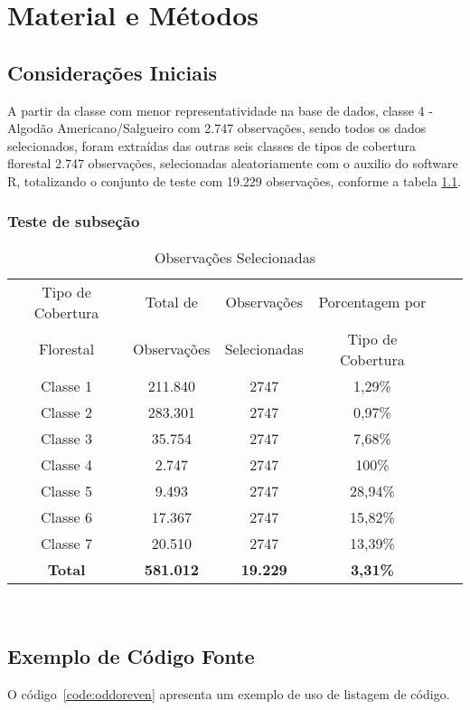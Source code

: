\chapter{Material e Métodos}

\section[CONSIDERAÇÕES INICIAIS]{Considerações Iniciais}
A partir da classe com menor representatividade na base de dados, classe 4 - Algodão Americano/Salgueiro com 2.747 observações, sendo todos os dados selecionados, foram extraídas das outras seis classes de tipos de cobertura florestal 2.747 observações, selecionadas aleatoriamente com o auxilio do software R, totalizando o conjunto de teste com 19.229 observações, conforme a tabela \ref{tb:dados}.
\subsection[Teste de subseção]{ Teste de subseção}
\begin{table}[htbp]
\caption{Observações Selecionadas}
\label{tb:dados}
\centering
\setlength{\tabcolsep}{5pt}
\begin{tabular}{cccccc}
\hline
Tipo de Cobertura  &Total de  &Observações  &Porcentagem por \\
Florestal &Observações &Selecionadas &Tipo de Cobertura \\
\hline
Classe 1 &211.840 &2747 &1,29\% \\
Classe 2 &283.301 &2747 &0,97\% \\
Classe 3 &35.754  &2747 &7,68\% \\
Classe 4 &2.747   &2747 &100\% \\
Classe 5 &9.493   &2747 &28,94\% \\
Classe 6 &17.367  &2747 &15,82\% \\
Classe 7 &20.510  &2747 &13,39\% \\
\hline
\textbf{Total} &\textbf{581.012} &\textbf{19.229} &\textbf{3,31\%} \\
\hline
\end{tabular}
\\
\end{table}

\section{Exemplo de Código Fonte}
O código~\ref{code:oddoreven} apresenta um exemplo de uso de listagem de código.

